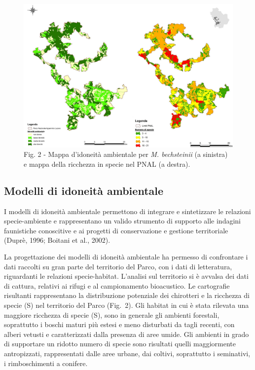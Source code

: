 \begin{multicols}{2}
\begin{figure}[!t] %
  \centering\small
  \includegraphics[width=\linewidth]{abstracts/extended_abstracts/P001_Figure2.png}
  \caption*{Fig. 2 - Mappa d’idoneità ambientale per \emph{M. bechsteinii} (a sinistra) e mappa della ricchezza in specie nel PNAL (a destra).}
\end{figure}

\subsection*{Modelli di idoneità ambientale}
I modelli di idoneità ambientale permettono di integrare e sintetizzare le relazioni specie-ambiente e rappresentano un valido strumento di supporto alle indagini faunistiche conoscitive e ai progetti di conservazione e gestione territoriale (Duprè, 1996; Boitani et al., 2002). 

La progettazione dei modelli di idoneità ambientale ha permesso di confrontare i dati raccolti su gran parte del territorio del Parco, con i dati di letteratura, riguardanti le relazioni specie-habitat. L’analisi sul territorio si è avvalsa dei dati di cattura, relativi ai rifugi e al campionamento bioacustico. Le cartografie risultanti rappresentano la distribuzione potenziale dei chirotteri e la ricchezza di specie (S) nel territorio del Parco (Fig.~2). Gli habitat in cui è stata rilevata una maggiore ricchezza di specie (S), sono in generale gli ambienti forestali, soprattutto i boschi maturi più estesi e meno disturbati da tagli recenti, con alberi vetusti e caratterizzati dalla presenza di aree umide. Gli ambienti in grado di supportare un ridotto numero di specie sono risultati quelli maggiormente antropizzati, rappresentati dalle aree urbane, dai coltivi, soprattutto i seminativi, i rimboschimenti a conifere.


\end{multicols}
